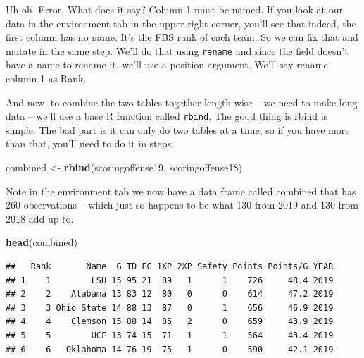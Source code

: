 \documentclass[]{book}
\newenvironment{Shaded}{\begin{snugshade}}{\end{snugshade}}
\newcommand{\DataTypeTok}[1]{\textcolor[rgb]{0.13,0.29,0.53}{#1}}
\newcommand{\DecValTok}[1]{\textcolor[rgb]{0.00,0.00,0.81}{#1}}
\newcommand{\KeywordTok}[1]{\textcolor[rgb]{0.13,0.29,0.53}{\textbf{#1}}}
\newcommand{\NormalTok}[1]{#1}
\newcommand{\OperatorTok}[1]{\textcolor[rgb]{0.81,0.36,0.00}{\textbf{#1}}}
\newcommand{\StringTok}[1]{\textcolor[rgb]{0.31,0.60,0.02}{#1}}
\begin{document}
Uh oh. Error. What does it say? Column 1 must be named. If you look at our data in the environment tab in the upper right corner, you'll see that indeed, the first column has no name. It's the FBS rank of each team. So we can fix that and mutate in the same step. We'll do that using \texttt{rename} and since the field doesn't have a name to rename it, we'll use a position argument. We'll say rename column 1 as Rank.

\begin{Shaded}
\end{Shaded}

And now, to combine the two tables together length-wise -- we need to make long data -- we'll use a base R function called \texttt{rbind}. The good thing is rbind is simple. The bad part is it can only do two tables at a time, so if you have more than that, you'll need to do it in steps.

\begin{Shaded}
\begin{Highlighting}[]
\NormalTok{combined <-}\StringTok{ }\KeywordTok{rbind}\NormalTok{(scoringoffense19, scoringoffense18)}
\end{Highlighting}
\end{Shaded}

Note in the environment tab we now have a data frame called combined that has 260 observations -- which just so happens to be what 130 from 2019 and 130 from 2018 add up to.

\begin{Shaded}
\begin{Highlighting}[]
\KeywordTok{head}\NormalTok{(combined)}
\end{Highlighting}
\end{Shaded}

\begin{verbatim}
##   Rank       Name  G TD FG 1XP 2XP Safety Points Points/G YEAR
## 1    1        LSU 15 95 21  89   1      1    726     48.4 2019
## 2    2    Alabama 13 83 12  80   0      0    614     47.2 2019
## 3    3 Ohio State 14 88 13  87   0      1    656     46.9 2019
## 4    4    Clemson 15 88 14  85   2      0    659     43.9 2019
## 5    5        UCF 13 74 15  71   1      1    564     43.4 2019
## 6    6   Oklahoma 14 76 19  75   1      0    590     42.1 2019
\end{verbatim}
\end{document}
